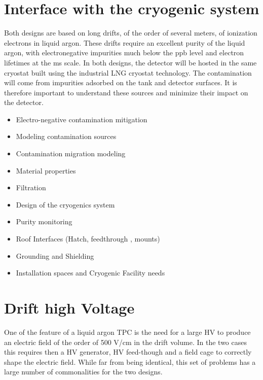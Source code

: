 \section{Interface with the cryogenic system}

Both designs are based on long drifts, of the order of several meters, of ionization electrons in liquid argon. These drifts require an excellent purity of the liquid argon, with electronegative impurities much below the ppb level and electron lifetimes at the ms scale. In both designs, the detector will be hosted in the same cryostat built using the industrial LNG cryostat technology. The contamination will come from impurities adsorbed on the tank and detector surfaces. It is therefore important to understand these sources and minimize their impact on the detector.

\begin{itemize}


\item Electro-negative	
  contamination	
  mitigation	
  	
 
\item Modeling	
  contamination	
  sources	
  

\item Contamination	
  migration	
  modeling	
  	 
\item Material	
  properties	
  
\item Filtration	
  	  
\item Design	  of	 the cryogenics system
  
\item Purity	
  monitoring	
  
\item Roof	
  Interfaces	
  (Hatch,	feedthrough
,	  mounts)	
  
\item Grounding	
  and	
  Shielding	
  
\item Installation	
  spaces	
  and	
  Cryogenic Facility	
  needs	
  

\end{itemize}

\section{Drift high Voltage}

One of the feature of a liquid argon TPC is the need for a large HV to produce an electric field of the order of 500 V/cm in the drift volume. 
In the two cases this requires then a HV generator, HV feed-though and a field cage to correctly shape the electric field. While far from being identical, this set of problems has a large number of commonalities for the two designs. 

